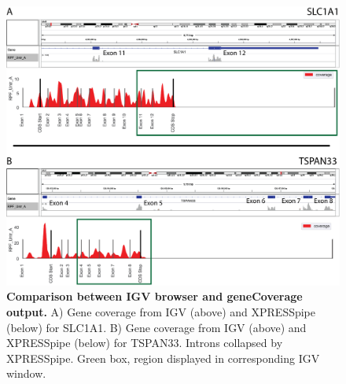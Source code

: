 \documentclass[10pt, oneside]{article}
\begin{document}
\begin{figure}
\centering
  \includegraphics[width=160mm]{figures/xpresspipe_supplement2.png}
  \caption{\textbf{Comparison between IGV browser and geneCoverage output.} A) Gene coverage from IGV (above) and XPRESSpipe (below) for SLC1A1. B) Gene coverage from IGV (above) and XPRESSpipe (below) for TSPAN33. Introns collapsed by XPRESSpipe. Green box, region displayed in corresponding IGV window.}
  \label{fig:supplement2}
\end{figure}
\end{document}
